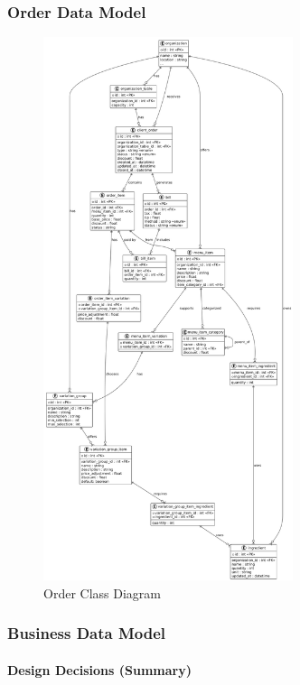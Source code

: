 \documentclass[]{VUMIFTemplateClass}
\begin{document}
\subsubsection{Order Data Model}
\begin{figure}[H]
    \centering
    \includegraphics[width=0.65\textwidth]{docs/ps-design/design-document/images/diagrams/orders/order_model_class.png}
    \caption{Order Class Diagram}
    \label{fig:order_class_diagram}
\end{figure}

\subsubsection{Business Data Model}

\paragraph{Design Decisions (Summary)}
\end{document}
